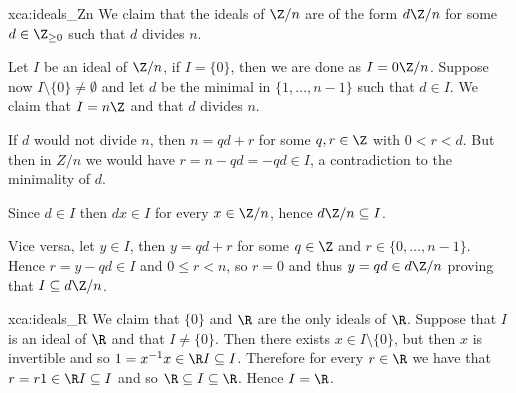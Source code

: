  \begin{sol}{xca:ideals_Zn}
     We claim that the ideals of $\Z/n$ are of the form $d\Z/n$ for some $d\in\Z_{\geq 0}$ such that $d$ divides $n$.

     Let $I$ be an ideal of $\Z/n$, if $I=\{0\}$, then we are done as $I=0\Z/n$.
     Suppose now $I\setminus\{0\}\neq \emptyset$
     and let $d$ be the minimal in $\{1,\dots, n-1\}$ 
     such that $d\in I$.
     We claim that $I=n\Z$ and that $d$ divides $n$.

     If $d$ would not divide $n$,
     then $n=qd+r$ for some $q,r\in \Z$ with $0<r<d$.
     But then in $Z/n$ we would have $r=n-qd=-qd\in I$, a contradiction to the minimality of $d$.
      
     Since $d\in I$ then $dx\in I$ for every $x\in \Z/n$, hence $d\Z/n\subseteq I$.

     Vice versa, let $y\in I$, then $y=qd+r$ for some $q\in \Z$ and $r\in\{0,\dots, n-1\}$.
     Hence $r=y-qd\in I$ and $0\leq r<n$, so $r=0$ and thus $y=qd\in d\Z/n$ proving that $I\subseteq d\Z/n$.
 \end{sol} 

 \begin{sol}{xca:ideals_R}
     We claim that $\{0\}$ and $\R$ are the only ideals of $\R$.
     Suppose that $I$ is an ideal of $\R$ and that $I\neq\{0\}$.
     Then there exists $x\in I\setminus\{0\}$, but then $x$ is invertible and so $1=x^{-1}x\in \R I\subseteq I$.
     Therefore for every $r\in \R$ we have that $r=r1\in \R I\subseteq I$ and so $\R\subseteq I\subseteq \R$. Hence $I=\R$.
 \end{sol} 

